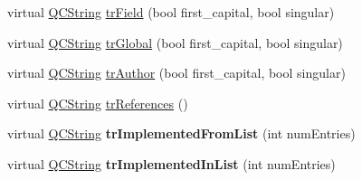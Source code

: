 \begin{DoxyCompactItemize}
\item 
virtual \hyperlink{class_q_c_string}{Q\-C\-String} \hyperlink{class_translator_polish_a0f756691ea3527915c0ed37ecb48450d}{tr\-Field} (bool first\-\_\-capital, bool singular)
\item 
virtual \hyperlink{class_q_c_string}{Q\-C\-String} \hyperlink{class_translator_polish_ac9f8f800abe2f721d9cf0bdfc9b6ec6f}{tr\-Global} (bool first\-\_\-capital, bool singular)
\item 
virtual \hyperlink{class_q_c_string}{Q\-C\-String} \hyperlink{class_translator_polish_a8ce93b65c315fc4e942a1dc4cc80fa54}{tr\-Author} (bool first\-\_\-capital, bool singular)
\item 
virtual \hyperlink{class_q_c_string}{Q\-C\-String} \hyperlink{class_translator_polish_a54eaa9a933568bfd7eaffe36b7872eb0}{tr\-References} ()
\item 
\hypertarget{class_translator_polish_a01f548ba9f63fd42bc070ba1247e6543}{virtual \hyperlink{class_q_c_string}{Q\-C\-String} {\bfseries tr\-Implemented\-From\-List} (int num\-Entries)}\label{class_translator_polish_a01f548ba9f63fd42bc070ba1247e6543}

\item 
\hypertarget{class_translator_polish_aa2aa7d2d195ce999a256e7769605c0f0}{virtual \hyperlink{class_q_c_string}{Q\-C\-String} {\bfseries tr\-Implemented\-In\-List} (int num\-Entries)}\label{class_translator_polish_aa2aa7d2d195ce999a256e7769605c0f0}


\end{DoxyCompactItemize}
